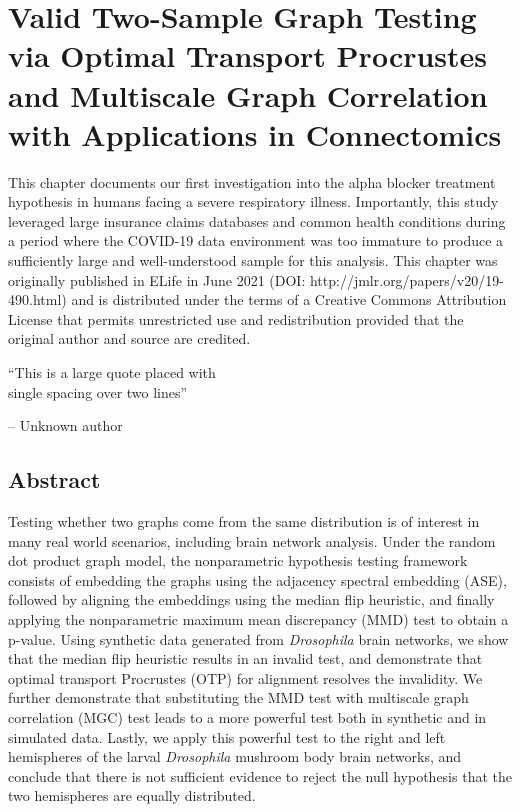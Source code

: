 \chapter[Two-Sample Graph Testing]{Valid Two-Sample Graph Testing via Optimal Transport Procrustes and Multiscale Graph Correlation with Applications in Connectomics} \label{chap:nonpar}

This chapter documents our first investigation into the alpha blocker treatment hypothesis in humans facing a severe respiratory illness. Importantly, this study leveraged large insurance claims databases and common health conditions during a period where the COVID-19 data environment was too immature to produce a sufficiently large and well-understood sample for this analysis. This chapter was originally published in ELife in June 2021 (DOI:  http://jmlr.org/papers/v20/19-490.html) and is distributed under the terms of a Creative Commons Attribution License that permits unrestricted use and redistribution provided that the original author and source are credited.

\begin{singlespace}
    \epigraph{\enquote{This is a large quote placed with \\ 
    single spacing over two lines}}{-- Unknown author}
\end{singlespace}

\pagebreak
\section*{Abstract}
Testing whether two graphs come from the same distribution is of interest in many real world scenarios, including brain network analysis.
Under the random dot product graph model, the nonparametric hypothesis testing framework consists of embedding the graphs using the adjacency spectral embedding (ASE), followed by  aligning the embeddings using the median flip heuristic, and finally applying the nonparametric maximum mean discrepancy (MMD) test to obtain a p-value.
Using synthetic data generated from \textit{Drosophila} brain networks, we show that the median flip heuristic results in an invalid test, and demonstrate that optimal transport Procrustes (OTP) for alignment resolves the invalidity.
We further demonstrate that substituting the MMD test with multiscale graph correlation (MGC) test leads to a more powerful test both in synthetic and in simulated data.
Lastly, we apply this powerful test to the right and left hemispheres of the larval \textit{Drosophila} mushroom body brain networks, and conclude that there is not sufficient evidence to reject the null hypothesis that the two hemispheres are equally distributed.

